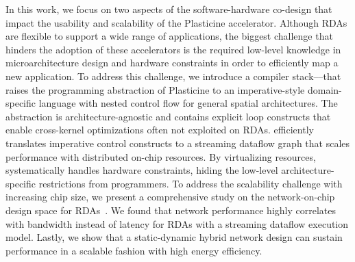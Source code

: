 In this work, we focus on two aspects of the software-hardware co-design that impact the usability
and scalability of the Plasticine accelerator.
Although RDAs are flexible to support a wide range of applications, 
the biggest challenge that hinders the adoption of these accelerators is 
the required low-level knowledge in microarchitecture design and hardware constraints in
order to efficiently map a new application.
To address this challenge, we introduce a compiler stack--\name--that raises the programming abstraction of
Plasticine to an imperative-style domain-specific language with nested control
flow for general spatial architectures.
The abstraction is architecture-agnostic and contains explicit loop constructs that enable
cross-kernel optimizations often not exploited on RDAs.
\name efficiently translates imperative control constructs to a streaming
dataflow graph that scales performance with distributed on-chip resources.
By virtualizing resources, \name systematically handles hardware constraints, hiding
the low-level architecture-specific restrictions from programmers.
To address the scalability challenge with increasing chip size,
we present a comprehensive study on the network-on-chip design space for RDAs~\cite{network}.
We found that network performance highly correlates with bandwidth instead of latency
for RDAs with a streaming dataflow execution model.
Lastly, we show that a static-dynamic hybrid network design can sustain performance in a
scalable fashion with high energy efficiency.
